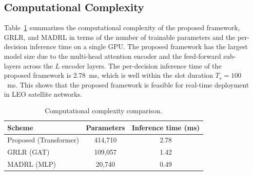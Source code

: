 \subsection{Computational Complexity}

Table~\ref{tab:complexity} summarizes the computational complexity of the proposed framework, GRLR, and MADRL in terms of the number of trainable parameters and the per-decision inference time on a single GPU. The proposed framework has the largest model size due to the multi-head attention encoder and the feed-forward sub-layers across the $L$ encoder layers. The per-decision inference time of the proposed framework is $2.78$~ms, which is well within the slot duration $T_s = 100$~ms. This shows that the proposed framework is feasible for real-time deployment in LEO satellite networks.

\begin{table}[t]
\centering
\caption{Computational complexity comparison.}
\label{tab:complexity}
\begin{tabular}{lcc}
\toprule
\textbf{Scheme} & \textbf{Parameters} & \textbf{Inference time (ms)} \\
\midrule
Proposed (Transformer) & 414{,}710 & 2.78 \\
GRLR (GAT)             & 109{,}057 & 1.42 \\
MADRL (MLP)            &  20{,}740 & 0.49 \\
\bottomrule
\end{tabular}
\end{table}
